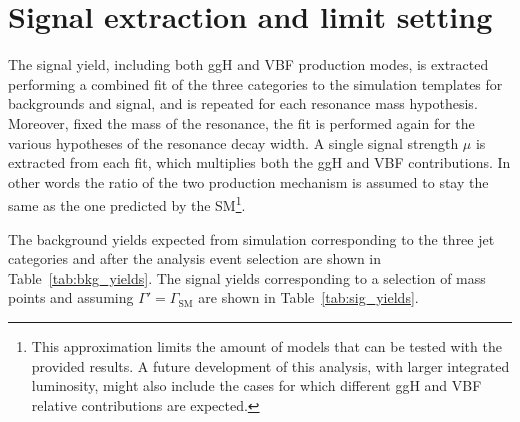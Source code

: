 \section{Signal extraction and limit setting}\label{chap6:SignalExtractionAndLimits}

The signal yield, including both ggH and VBF production modes, is extracted performing a combined fit of the three categories to the \mti simulation templates for backgrounds and signal, and is repeated for each resonance mass hypothesis. Moreover, fixed the mass of the resonance, the fit is performed again for the various hypotheses of the resonance decay width. A single signal strength $\mu$ is extracted from each fit, which multiplies both the ggH and VBF contributions. In other words the ratio of the two production mechanism is assumed to stay the same as the one predicted by the SM\footnote{This approximation limits the amount of models that can be tested with the provided results. A future development of this analysis, with larger integrated luminosity, might also include the cases for which different ggH and VBF relative contributions are expected.}.

The background yields expected from simulation corresponding to the three jet categories and after the analysis event selection are shown in Table~\ref{tab:bkg_yields}. The signal yields corresponding to a selection of mass points and assuming $\Gamma' = \Gamma_\mathrm{SM}$ are shown in Table~\ref{tab:sig_yields}.

